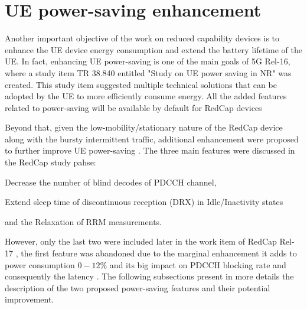 \documentclass[conference]{IEEEtran}
\begin{document}
\section{UE power-saving enhancement}
\label{sec:5-power-saving}






Another important objective of the work on reduced capability devices is to enhance the UE device energy consumption and extend the battery lifetime of the UE. In fact, enhancing UE power-saving is one of the main goals of 5G Rel-16, where a study item TR 38.840 \cite{3gpp.38.840} entitled "Study on UE power saving in NR" was created. This study item suggested multiple technical solutions that can be adopted by the UE to more efficiently consume energy. All the added features related to power-saving will be available by default for RedCap devices

Beyond that, given the low-mobility/stationary nature of the RedCap device along with the bursty intermittent traffic, additional enhancement were proposed to further improve UE power-saving . The three main features were discussed in the RedCap study pahse:
\begin{enumerate*}
    \item Decrease the number of blind decodes of PDCCH channel,
    \item Extend sleep time of discontinuous reception (DRX) in Idle/Inactivity states
    \item and the Relaxation of RRM measurements. 
\end{enumerate*}
However, only the last two were included later in the work item of RedCap Rel-17 \cite{3gpp_revised_2022-1_RP-220966}, the first feature was abandoned due to the marginal enhancement it adds to power consumption $0-12\%$ and its big impact on PDCCH blocking rate and consequently the latency \cite{ratasuk_reduced_2021}. The following subsections present in more details the description of the two proposed power-saving features and their potential improvement.
\end{document}
